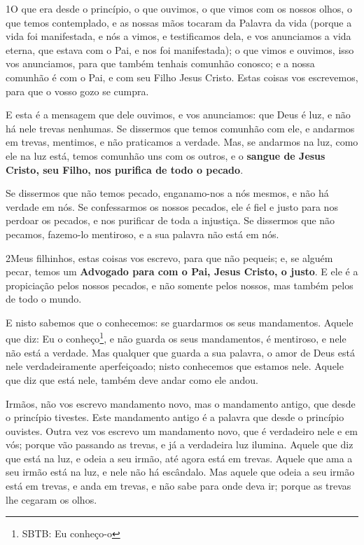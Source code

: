 
\lettrine{1} O que era desde o princípio, o que ouvimos, o que
vimos com os nossos olhos, o que temos contemplado, e as nossas mãos
tocaram da Palavra da vida (porque a vida foi manifestada, e nós
a vimos, e testificamos dela, e vos anunciamos a vida eterna, que
estava com o Pai, e nos foi manifestada); o que vimos e ouvimos,
isso vos anunciamos, para que também tenhais comunhão conosco; e a
nossa comunhão é com o Pai, e com seu Filho Jesus Cristo. Estas
coisas vos escrevemos, para que o vosso gozo se cumpra.

E esta é a mensagem que dele ouvimos, e vos anunciamos: que Deus é
luz, e não há nele trevas nenhumas. Se dissermos que temos
comunhão com ele, e andarmos em trevas, mentimos, e não praticamos a
verdade. Mas, se andarmos na luz, como ele na luz está, temos
comunhão uns com os outros, e o \textbf{sangue de Jesus Cristo, seu
Filho, nos purifica de todo o pecado}.

Se dissermos que não temos pecado, enganamo-nos a nós mesmos, e
não há verdade em nós. Se confessarmos os nossos pecados, ele é
fiel e justo para nos perdoar os pecados, e nos purificar de toda a
injustiça. Se dissermos que não pecamos, fazemo-lo mentiroso,
e a sua palavra não está em nós.

\medskip

\lettrine{2} Meus filhinhos, estas coisas vos escrevo, para
que não pequeis; e, se alguém pecar, temos um \textbf{Advogado para
com o Pai, Jesus Cristo, o justo}. E ele é a propiciação pelos
nossos pecados, e não somente pelos nossos, mas também pelos de todo
o mundo.

E nisto sabemos que o conhecemos: se guardarmos os seus
mandamentos. Aquele que diz: Eu o conheço\footnote{SBTB: Eu
conheço-o}, e não guarda os seus mandamentos, é mentiroso, e nele
não está a verdade. Mas qualquer que guarda a sua palavra, o
amor de Deus está nele verdadeiramente aperfeiçoado; nisto
conhecemos que estamos nele. Aquele que diz que está nele,
também deve andar como ele andou.

Irmãos, não vos escrevo mandamento novo, mas o mandamento antigo,
que desde o princípio tivestes. Este mandamento antigo é a palavra
que desde o princípio ouvistes. Outra vez vos escrevo um
mandamento novo, que é verdadeiro nele e em vós; porque vão passando
as trevas, e já a verdadeira luz ilumina. Aquele que diz que
está na luz, e odeia a seu irmão, até agora está em trevas.
Aquele que ama a seu irmão está na luz, e nele não há
escândalo. Mas aquele que odeia a seu irmão está em trevas, e
anda em trevas, e não sabe para onde deva ir; porque as trevas lhe
cegaram os olhos.

